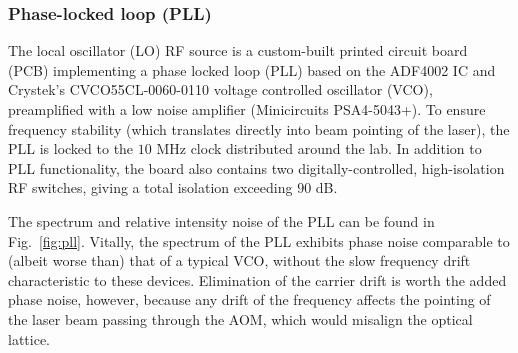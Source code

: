\documentclass[twocolumn,aps,pra,showpacs,preprintnumbers,bibnotes]{revtex4-1}
\begin{document}
\subsubsection{Phase-locked loop (PLL)}
The local oscillator (LO) RF source is a custom-built printed circuit board (PCB) implementing a phase locked loop (PLL) based on the ADF4002 IC and Crystek's CVCO55CL-0060-0110 voltage controlled oscillator (VCO), preamplified with a low noise amplifier (Minicircuits PSA4-5043+).
To ensure frequency stability (which translates directly into beam pointing of the laser), the PLL is locked to the $10$ MHz clock distributed around the lab.
In addition to PLL functionality, the board also contains two digitally-controlled, high-isolation RF switches, giving a total isolation exceeding $90$ dB.

The spectrum and relative intensity noise of the PLL can be found in Fig.~\ref{fig:pll}.
Vitally, the spectrum of the PLL exhibits phase noise comparable to (albeit worse than) that of a typical VCO, without the slow frequency drift characteristic to these devices.
Elimination of the carrier drift is worth the added phase noise, however, because any drift of the frequency affects the pointing of the laser beam passing through the AOM, which would misalign the optical lattice.
\end{document}
